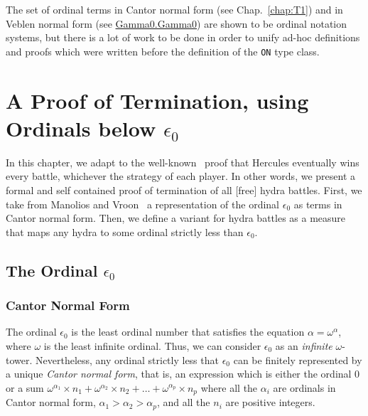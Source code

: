 \begin{remark}
 The set of ordinal terms in Cantor normal form (see Chap.~\ref{chap:T1}) and 
in Veblen normal form (see 
\href{../theories/html/hydras.Gamma0.Gamma0.html}{Gamma0.Gamma0}) are shown to be ordinal notation systems, but there is a lot of work to be done in order to unify ad-hoc  definitions and proofs which were written before the definition of the \texttt{ON} type class.
\end{remark}











\chapter[A proof of termination, using epsilon0]{A Proof of Termination, using Ordinals below \texorpdfstring{$\epsilon_0$}{Epsilon0}}

\label{cnf-math-def}
\label{chap:T1}

In this chapter, we adapt to \coq{} the well-known~\cite{KP82}  proof that Hercules eventually wins every battle, whichever the strategy  of each player.
In other words, we present  a formal and self contained proof of termination  of all [free] hydra battles.
First, we take from Manolios and Vroon~\cite{Manolios2005} a representation of the ordinal $\epsilon_0$ as terms in Cantor normal form. Then, we define a variant for hydra battles as a measure that maps any hydra to some ordinal strictly less than $\epsilon_0$.



\section{The Ordinal \texorpdfstring{\(\epsilon_0\)}{epsilon0}}
\label{sec:epsilon0-intro}

\subsection{Cantor Normal Form}

The ordinal \(\epsilon_0\) is the least ordinal number that satisfies 
the equation \(\alpha = \omega^\alpha\), where \(\omega\) is 
the least infinite ordinal. Thus, we can consider \(\epsilon_0\) as an
\emph{infinite} \(\omega\)-tower.
Nevertheless, 
any ordinal strictly less that \(\epsilon_0\) 
can be finitely represented by a unique  \emph{Cantor normal form}, 
that is, an expression  which is either  the ordinal \(0\) or 
a sum  \(\omega^{\alpha_1} \times n_1 + \omega^{\alpha_2} \times n_2 + 
  \dots + \omega^{\alpha_p} \times n_p\) where all the \(\alpha_i\) 
are ordinals in Cantor  normal form, \(\alpha_1 > \alpha_2 > \alpha_p\), 
and all the \(n_i\) are positive integers.

